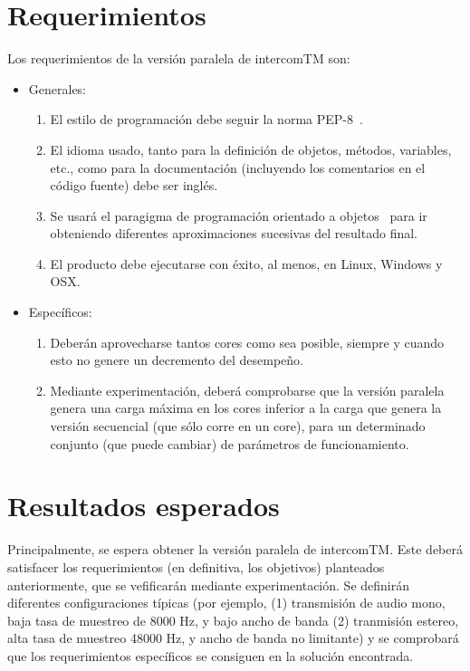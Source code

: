 \documentclass[titlepage, 12pt, a4paper, oneside]{article}
\begin{document}
\section{Requerimientos}
\label{sec:requerimientos}
Los requerimientos de la versión paralela de intercomTM son:

\begin{itemize}
\item Generales:
  \begin{enumerate}
  \item El estilo de programación debe seguir la norma
    PEP-8~\cite{PEP8}.
  \item El idioma usado, tanto para la definición de objetos, métodos,
    variables, etc., como para la documentación (incluyendo los
    comentarios en el código fuente) debe ser inglés.
  \item Se usará el paragigma de programación orientado a
    objetos~\cite{schach2008object} para ir obteniendo diferentes
    aproximaciones sucesivas del resultado final.
  \item El producto debe ejecutarse con éxito, al menos, en Linux,
    Windows y OSX.
  \end{enumerate}
\item Específicos:
  \begin{enumerate}
  \item Deberán aprovecharse tantos cores como sea posible, siempre y
    cuando esto no genere un decremento del desempeño.
  \item Mediante experimentación, deberá comprobarse que la versión
    paralela genera una carga máxima en los cores inferior a la carga
    que genera la versión secuencial (que sólo corre en un core), para
    un determinado conjunto (que puede cambiar) de parámetros de
    funcionamiento.
  \end{enumerate}
\end{itemize}

\section{Resultados esperados}
\label{sec:resultados}
Principalmente, se espera obtener la versión paralela de intercomTM.
Este deberá satisfacer los requerimientos (en definitiva, los
objetivos) planteados anteriormente, que se vefificarán mediante
experimentación.  Se definirán diferentes configuraciones típicas (por
ejemplo, (1) transmisión de audio mono, baja tasa de muestreo de 8000
Hz, y bajo ancho de banda (2) tranmisión estereo, alta tasa de
muestreo 48000 Hz, y ancho de banda no limitante) y se comprobará que
los requerimientos específicos se consiguen en la solución encontrada.
\end{document}
